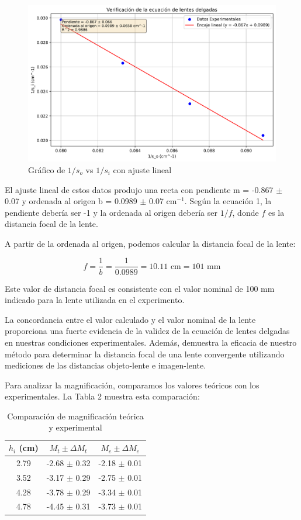 \documentclass[twocolumn,a4paper,11pt]{scrartcl}
\begin{document}
\begin{figure}[h]
    \centering
    \includegraphics[width=0.8\linewidth]{lens_equation_verification.png}
    \caption{Gráfico de $1/s_o$ vs $1/s_i$ con ajuste lineal}
    \label{fig:graph}
\end{figure}

El ajuste lineal de estos datos produjo una recta con pendiente m = -0.867 $\pm$ 0.07 y ordenada al origen b = 0.0989 $\pm$ 0.07 cm$^{-1}$. Según la ecuación 1, la pendiente debería ser -1 y la ordenada al origen debería ser $1/f$, donde $f$ es la distancia focal de la lente.

A partir de la ordenada al origen, podemos calcular la distancia focal de la lente:

\begin{equation}
f = \frac{1}{b} = \frac{1}{0.0989} = 10.11 \text{ cm} = 101 \text{ mm}
\end{equation}

Este valor de distancia focal es consistente con el valor nominal de 100 mm indicado para la lente utilizada en el experimento.

La concordancia entre el valor calculado y el valor nominal de la lente proporciona una fuerte evidencia de la validez de la ecuación de lentes delgadas en nuestras condiciones experimentales. Además, demuestra la eficacia de nuestro método para determinar la distancia focal de una lente convergente utilizando mediciones de las distancias objeto-lente e imagen-lente.

Para analizar la magnificación, comparamos los valores teóricos con los experimentales. La Tabla 2 muestra esta comparación:

\begin{table}[h]
\centering
\caption{Comparación de magnificación teórica y experimental}
\label{tab:magnificacion}
\begin{tabular}{|c|c|c|}
\hline
$h_i$ (cm) & $M_t \pm \Delta M_t$ & $M_e \pm \Delta M_e$ \\
\hline
2.79 & -2.68 $\pm$ 0.32 & -2.18 $\pm$ 0.01 \\
3.52 & -3.17 $\pm$ 0.29 & -2.75 $\pm$ 0.01 \\
4.28 & -3.78 $\pm$ 0.29 & -3.34 $\pm$ 0.01 \\
4.78 & -4.45 $\pm$ 0.31 & -3.73 $\pm$ 0.01 \\
\hline
\end{tabular}
\end{table}
\end{document}
